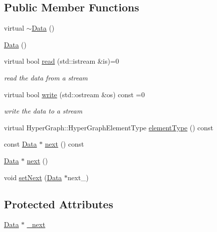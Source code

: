 \subsection*{Public Member Functions}
\begin{DoxyCompactItemize}
\item 
virtual \mbox{\hyperlink{classg2o_1_1_optimizable_graph_1_1_data_aa81fb1975f34e3aaf4c5110f7778a54e}{$\sim$\+Data}} ()
\item 
\mbox{\hyperlink{classg2o_1_1_optimizable_graph_1_1_data_a647b9fcb65aa8309f7103635135ea513}{Data}} ()
\item 
virtual bool \mbox{\hyperlink{classg2o_1_1_optimizable_graph_1_1_data_a4a206c86daba1b47425199befd2e1ed4}{read}} (std\+::istream \&is)=0
\begin{DoxyCompactList}\small\item\em read the data from a stream \end{DoxyCompactList}\item 
virtual bool \mbox{\hyperlink{classg2o_1_1_optimizable_graph_1_1_data_ad80cd8ea8013c54c766684ec0ef3daa3}{write}} (std\+::ostream \&os) const =0
\begin{DoxyCompactList}\small\item\em write the data to a stream \end{DoxyCompactList}\item 
virtual Hyper\+Graph\+::\+Hyper\+Graph\+Element\+Type \mbox{\hyperlink{classg2o_1_1_optimizable_graph_1_1_data_aa98d48f62d4c620cb62fbaeb1775389b}{element\+Type}} () const
\item 
const \mbox{\hyperlink{classg2o_1_1_optimizable_graph_1_1_data}{Data}} $\ast$ \mbox{\hyperlink{classg2o_1_1_optimizable_graph_1_1_data_a1e36ab8bfbbd4df1639338330bbaaf3c}{next}} () const
\item 
\mbox{\hyperlink{classg2o_1_1_optimizable_graph_1_1_data}{Data}} $\ast$ \mbox{\hyperlink{classg2o_1_1_optimizable_graph_1_1_data_af9c0427357f1e81f9008c3173fddf34c}{next}} ()
\item 
void \mbox{\hyperlink{classg2o_1_1_optimizable_graph_1_1_data_a5811aac3f8eab3c19207663e946b343b}{set\+Next}} (\mbox{\hyperlink{classg2o_1_1_optimizable_graph_1_1_data}{Data}} $\ast$next\+\_\+)
\end{DoxyCompactItemize}
\subsection*{Protected Attributes}
\begin{DoxyCompactItemize}
\item 
\mbox{\hyperlink{classg2o_1_1_optimizable_graph_1_1_data}{Data}} $\ast$ \mbox{\hyperlink{classg2o_1_1_optimizable_graph_1_1_data_a8e0569f2b8cb8400d3eada1bd13c0ccb}{\+\_\+next}}
\end{DoxyCompactItemize}
